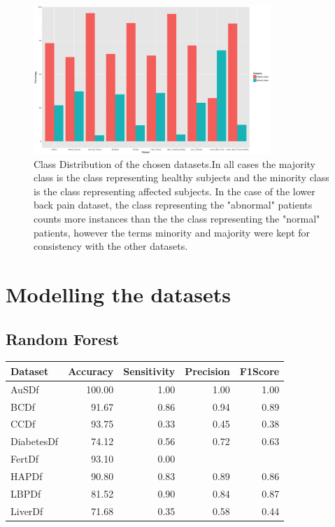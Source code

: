 \begin{figure}[H]
    \centering
    \includegraphics[width=0.8\textwidth]{ThesisTemplate/usingLatex/chapter4Images/figure4_1b.png}
    \caption{Class Distribution of the chosen datasets.\newline In all cases the majority class is the class representing healthy subjects and the minority class is the class representing affected subjects. In the case of the lower back pain dataset, the class representing the "abnormal" patients counts more instances than the the class representing the "normal" patients, however the terms minority and majority were kept for consistency with the other datasets.}
    \label{fig:my_label}
\end{figure}
\section{Modelling the datasets}
\subsection{Random Forest}
\begin{table}[ht]
\centering
\begin{tabular}{lrrrr}
  \hline
Dataset & Accuracy & Sensitivity & Precision & F1Score \\ 
  \hline
AuSDf & 100.00 & 1.00 & 1.00 & 1.00 \\ 
  BCDf & 91.67 & 0.86 & 0.94 & 0.89 \\ 
  CCDf & 93.75 & 0.33 & 0.45 & 0.38 \\ 
  DiabetesDf & 74.12 & 0.56 & 0.72 & 0.63 \\ 
  FertDf & 93.10 & 0.00 &  &  \\ 
  HAPDf & 90.80 & 0.83 & 0.89 & 0.86 \\ 
  LBPDf & 81.52 & 0.90 & 0.84 & 0.87 \\ 
  LiverDf & 71.68 & 0.35 & 0.58 & 0.44 \\ 
   \hline
\end{tabular}
\end{table}
